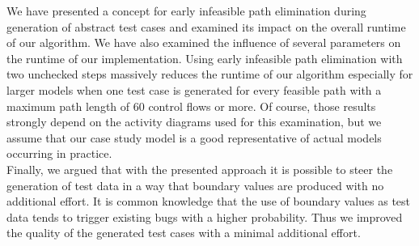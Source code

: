 We have presented a concept for early infeasible path elimination during generation of abstract test cases and examined its impact on the overall runtime of our algorithm. We have also examined the influence of several parameters on the runtime of our implementation. Using early infeasible path elimination with two unchecked steps massively reduces the runtime of our algorithm especially for larger models when one test case is generated for every feasible path with a maximum path length of 60 control flows or more. Of course, those results strongly depend on the activity diagrams used for this examination, but we assume that our case study model is a good representative of actual models occurring in practice.\\
Finally, we argued that with the presented approach it is possible to steer the generation of test data in a way that boundary values are produced with no additional effort. It is common knowledge that the use of boundary values as test data tends to trigger existing bugs with a higher probability. Thus we improved the quality of the generated test cases with a minimal additional effort.
